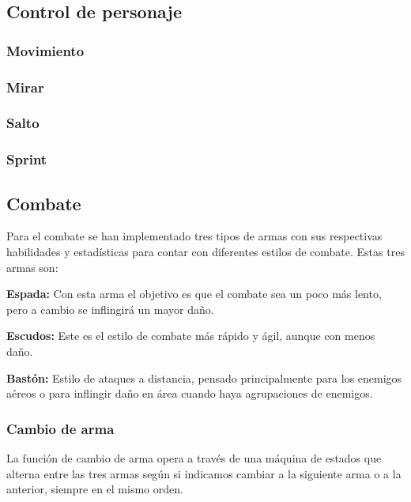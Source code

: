 \documentclass[12pt,spanish]{article}
\begin{document}
\newpage

\subsection{Control de personaje}

\subsubsection{Movimiento}

\subsubsection{Mirar}

\subsubsection{Salto}

\subsubsection{Sprint}

\newpage

\subsection{Combate}

    Para el combate se han implementado tres tipos de armas con sus respectivas habilidades y estadísticas para contar con diferentes estilos de combate. Estas tres armas son:

    \textbf{Espada:} Con esta arma el objetivo es que el combate sea un poco más lento, pero a cambio se inflingirá un mayor daño.

    \textbf{Escudos:} Este es el estilo de combate más rápido y ágil, aunque con menos daño.

    \textbf{Bastón:} Estilo de ataques a distancia, pensado principalmente para los enemigos aéreos o para inflingir daño en área cuando haya agrupaciones de enemigos.

\subsubsection{Cambio de arma}

    La función de cambio de arma opera a través de una máquina de estados que alterna entre las tres armas según si indicamos cambiar a la siguiente arma o a la anterior, siempre en el mismo orden.
\end{document}
